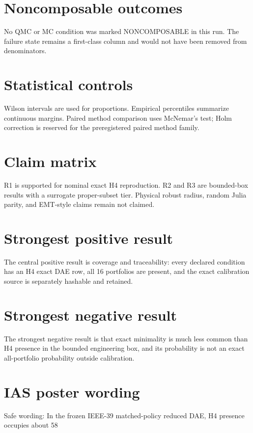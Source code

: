 \documentclass[11pt]{article}
\begin{document}
\section{Noncomposable outcomes}

No QMC or MC condition was marked NONCOMPOSABLE in this run. The failure state remains a first-class column and would not have been removed from denominators.

\section{Statistical controls}

Wilson intervals are used for proportions. Empirical percentiles summarize continuous margins. Paired method comparison uses McNemar's test; Holm correction is reserved for the preregistered paired method family.

\section{Claim matrix}

R1 is supported for nominal exact H4 reproduction. R2 and R3 are bounded-box results with a surrogate proper-subset tier. Physical robust radius, random Julia parity, and EMT-style claims remain not claimed.

\section{Strongest positive result}

The central positive result is coverage and traceability: every declared condition has an H4 exact DAE row, all 16 portfolios are present, and the exact calibration source is separately hashable and retained.

\section{Strongest negative result}

The strongest negative result is that exact minimality is much less common than H4 presence in the bounded engineering box, and its probability is not an exact all-portfolio probability outside calibration.

\section{IAS poster wording}

Safe wording: In the frozen IEEE-39 matched-policy reduced DAE, H4 presence occupies about 58%
\end{document}
